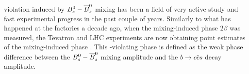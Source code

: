 %
%
%



\CP violation induced by $\Bs-\Bsbar$ mixing
has been a field of 
very active study and fast experimental progress 
in the past couple of years.
Similarly to what has happened at the \B factories 
a decade ago, when the \Bd mixing-induced phase $2\beta$
was measured, the Tevatron and LHC experiments are 
now obtaining point estimates
of the \Bs mixing-induced phase \phiccbars.
This \CP-violating phase is defined as 
the weak phase difference between
the $\Bs-\Bsbar$ mixing amplitude
and the $b \to c\bar{c}s$ decay amplitude.

